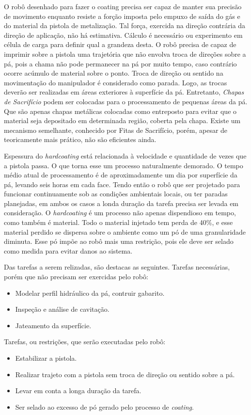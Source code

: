 O robô desenhado para fazer o coating precisa ser capaz de manter sua precisão
de movimento enquanto resiste a forção imposta pelo empuxo de saída do gás e do
material da pistola de metalização. Tal força, exercida na direção contrária da
direção de aplicação, não há estimativa. Cálculo é necessário ou experimento em
célula de carga para definir qual a grandeza desta. O robô precisa de capaz de
imprimir sobre a pistola uma trajetória que não envolva troca de direções sobre
a pá, pois a chama não pode permanecer na pá por muito tempo, caso contrário
ocorre acúmulo de material sobre o ponto. Troca de direção ou sentido na
movimentação do manipulador é considerado como parada. Logo, as trocas deverão
ser realizadas em áreas exteriores à superfície da pá. Entretanto, \emph{Chapas de
Sacrifício} podem ser colocadas para o processamento de pequenas áreas da pá. Que
são apenas chapas metálicas colocadas como entreposto para evitar que o material
seja depositado em determinada região, coberta pela chapa. Existe um mecanismo
semelhante, conhecido por Fitas de Sacrifício, porém, apesar de teoricamente
mais prático, não são eficientes ainda.

Espessura do \textit{hardcoating} está relacionada à velocidade e quantidade de vezes que
a pistola passa. O que torna esse um processo naturalmente demorado. O tempo
médio atual de processamento é de aproximadamente um dia por superfície da pá,
levando seis horas em cada face. Tendo então o robô que ser projetado para
funcionar continuamente sob as condições ambientais locais, ou ter paradas
planejadas, em ambos os casos a londa duração da tarefa precisa ser levada em
consideração. O \textit{hardcoating} é um processo não apenas dispendioso em
tempo, como também é material. Todo o material injetado tem perda de 40\%, e
esse material perdido se dispersa sobre o ambiente como um pó de uma
granularidade diminuta. Esse pó impõe ao robô mais uma restrição, pois ele deve
ser selado como medida para evitar danos ao sistema. 

Das tarefas a serem relizadas, são destacas as seguintes.
Tarefas necessárias, porém que não precisam ser exercidas pelo robô:
\begin{itemize}
  \item Modelar perfil hidráulico da pá, contruir gabarito.
  \item Inspeção e análise de cavitação.
  \item Jateamento da superfície.
\end{itemize}

Tarefas, ou restrições, que serão executadas pelo robô:
\begin{itemize}
  \item Estabilizar a pistola.
  \item Realizar trajeto com a pistola sem troca de direção ou sentido sobre a
  pá.
  \item Levar em conta a longa duração da tarefa.
  \item Ser selado ao excesso de pó gerado pelo processo de \textit{coating}.
\end{itemize}
